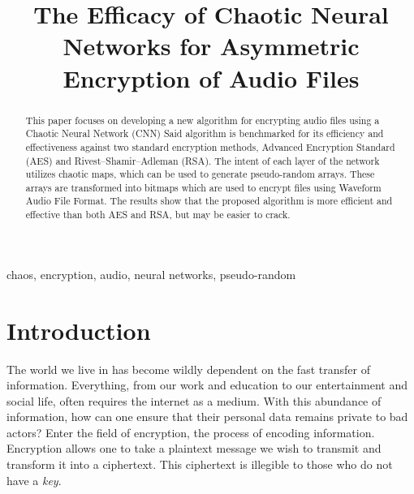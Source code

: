 \documentclass[conference]{IEEEtran}
\begin{document}
\title{The Efficacy of Chaotic Neural Networks for Asymmetric Encryption of Audio Files}

\author{
}

\maketitle

\begin{abstract}
This paper focuses on developing a new algorithm for encrypting audio files using a Chaotic Neural Network (CNN)
Said algorithm is benchmarked for its efficiency and effectiveness against two standard encryption methods, Advanced Encryption Standard (AES) and Rivest–Shamir–Adleman (RSA).
The intent of each layer of the network utilizes chaotic maps, which can be used to generate pseudo-random arrays.
These arrays are transformed into bitmaps which are used to encrypt files using Waveform Audio File Format.
The results show that the proposed algorithm is more efficient and effective than both AES and RSA, but may be easier to crack.
\end{abstract}

\begin{IEEEkeywords}
chaos, encryption, audio, neural networks, pseudo-random
\end{IEEEkeywords}

\section{Introduction}\label{sec:introduction}
The world we live in has become wildly dependent on the fast transfer of information.
Everything, from our work and education to our entertainment and social life, often requires the internet as a medium.
With this abundance of information, how can one ensure that their personal data remains private to bad actors?
Enter the field of encryption, the process of encoding information.
Encryption allows one to take a plaintext message we wish to transmit and transform it into a ciphertext.
This ciphertext is illegible to those who do not have a \textit{key}.
\end{document}
